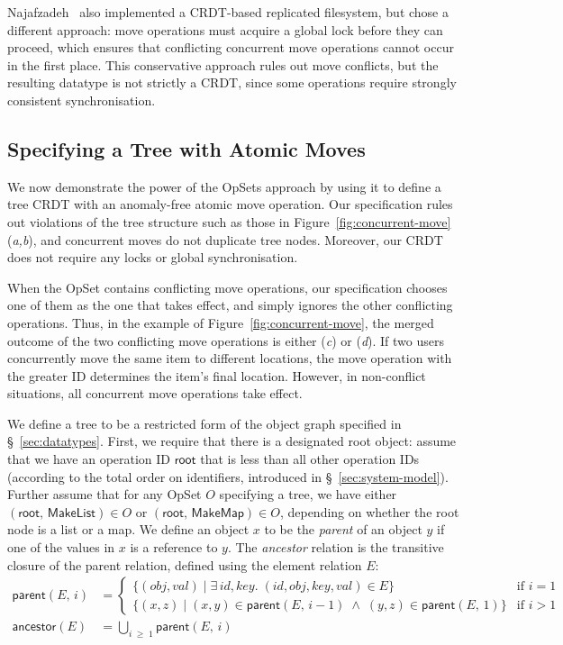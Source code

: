 Najafzadeh~\cite{Najafzadeh:2017vk,Najafzadeh:2018bw} also implemented a CRDT-based replicated filesystem, but chose a different approach: move operations must acquire a global lock before they can proceed, which ensures that conflicting concurrent move operations cannot occur in the first place.
This conservative approach rules out move conflicts, but the resulting datatype is not strictly a CRDT, since some operations require strongly consistent synchronisation.


\subsection{Specifying a Tree with Atomic Moves}\label{sec:tree-spec}

We now demonstrate the power of the OpSets approach by using it to define a tree CRDT with an anomaly-free atomic move operation.
Our specification rules out violations of the tree structure such as those in Figure~\ref{fig:concurrent-move}(\emph{a,b}), and concurrent moves do not duplicate tree nodes.
Moreover, our CRDT does not require any locks or global synchronisation.

When the OpSet contains conflicting move operations, our specification chooses one of them as the one that takes effect, and simply ignores the other conflicting operations.
Thus, in the example of Figure~\ref{fig:concurrent-move}, the merged outcome of the two conflicting move operations is either (\emph{c}) or (\emph{d}).
If two users concurrently move the same item to different locations, the move operation with the greater ID determines the item's final location.
However, in non-conflict situations, all concurrent move operations take effect.

We define a tree to be a restricted form of the object graph specified in \S~\ref{sec:datatypes}.
First, we require that there is a designated root object: assume that we have an operation ID $\mathsf{root}$ that is less than all other operation IDs (according to the total order on identifiers, introduced in \S~\ref{sec:system-model}).
Further assume that for any OpSet $O$ specifying a tree, we have either $(\mathsf{root},\, \mathsf{MakeList}) \in O$ or $(\mathsf{root},\, \mathsf{MakeMap}) \in O$, depending on whether the root node is a list or a map.
We define an object $x$ to be the \emph{parent} of an object $y$ if one of the values in $x$ is a reference to $y$.
The \emph{ancestor} relation is the transitive closure of the parent relation, defined using the element relation $E$:
\begin{align*}
    \mathsf{parent}(E,\, i) &=
    \begin{cases}
        \big\{ (\mathit{obj}, \mathit{val}) \mid \exists\,\mathit{id}, \mathit{key}.\;
            (\mathit{id}, \mathit{obj}, \mathit{key}, \mathit{val}) \in E \big\} & \text{if } i=1 \\
        \big\{ (x, z) \mid (x, y) \in \mathsf{parent}(E,\, i-1) \;\wedge\;
            (y, z) \in \mathsf{parent}(E,\, 1) \big\} & \text{if } i > 1
    \end{cases} \\[8pt]
    \mathsf{ancestor}(E) &= \bigcup_{i \;\geq\; 1} \mathsf{parent}(E,\, i)
\end{align*}


